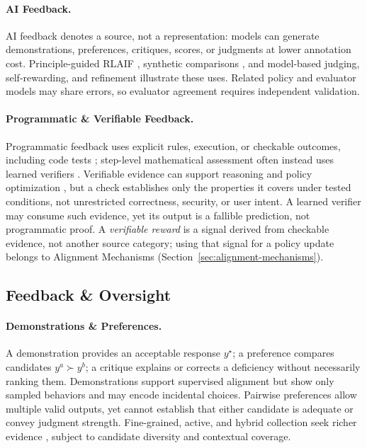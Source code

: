 \documentclass[11pt]{article}
\begin{document}
\paragraph{AI Feedback.}
AI feedback denotes a source, not a representation: models can generate demonstrations, preferences, critiques, scores, or judgments at lower annotation cost. Principle-guided RLAIF \citep{bai2022constitutional}, synthetic comparisons \citep{cui2024ultrafeedback}, and model-based judging, self-rewarding, and refinement \citep{zheng2023judging,liu2023geval,yuan2024selfrewarding,madaan2023selfrefine} illustrate these uses. Related policy and evaluator models may share errors, so evaluator agreement requires independent validation.

\paragraph{Programmatic \& Verifiable Feedback.}
Programmatic feedback uses explicit rules, execution, or checkable outcomes, including code tests \citep{li2022coderl}; step-level mathematical assessment often instead uses learned verifiers \citep{lightman2024verify,wang2024mathshepherd}. Verifiable evidence can support reasoning and policy optimization \citep{hosseini2024vstar,deepseek2025r1}, but a check establishes only the properties it covers under tested conditions, not unrestricted correctness, security, or user intent. A learned verifier may consume such evidence, yet its output is a fallible prediction, not programmatic proof. A \emph{verifiable reward} is a signal derived from checkable evidence, not another source category; using that signal for a policy update belongs to Alignment Mechanisms (Section~\ref{sec:alignment-mechanisms}).

\subsection{Feedback \& Oversight}
\label{subsec:feedback-oversight}

\paragraph{Demonstrations \& Preferences.}
A demonstration provides an acceptable response \(y^\star\); a preference compares candidates \(y^a \succ y^b\); a critique explains or corrects a deficiency without necessarily ranking them. Demonstrations support supervised alignment \citep{wei2022finetuned,chung2022scaling,wang2022supernatural} but show only sampled behaviors and may encode incidental choices. Pairwise preferences allow multiple valid outputs, yet cannot establish that either candidate is adequate or convey judgment strength. Fine-grained, active, and hybrid collection seek richer evidence \citep{wang2024helpsteer2,xu2024finegrained,muldrew2024active,li2025joint,miranda2025hybrid}, subject to candidate diversity and contextual coverage.
\end{document}
